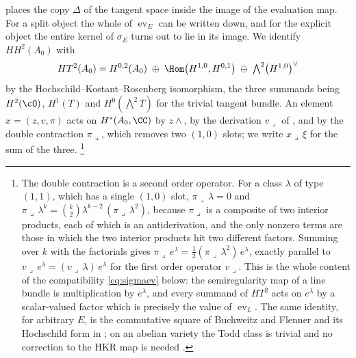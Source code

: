  places the copy $\Delta$ of the tangent space inside the
image of the evaluation map. For a split object the whole of
$\operatorname{ev}_{E}$ can be written down, and for the explicit object the
entire kernel of $\sigma_{E}$ turns out to lie in its image. We identify
$HH^{2}(A_{0})$ with
\begin{equation}\label{eq:HT2}
  HT^{2}(A_{0})
  =H^{0,2}(A_{0})\;\oplus\;\Hom\bigl(H^{1,0},H^{0,1}\bigr)\;\oplus\;
   \textstyle\bigwedge^{2}\bigl(H^{1,0}\bigr)^{\vee}
\end{equation}
by the Hochschild--Kostant--Rosenberg isomorphism, the three summands being
$H^{2}(\cO)$, $H^{1}(T)$ and $H^{0}(\bigwedge^{2}T)$ for the trivial tangent
bundle. An element $x=(z,v,\pi)$ acts on $H^{*}(A_{0},\CC)$ by $z\wedge$, by
the derivation $v\lrcorner$ of , and by the double
contraction $\pi\lrcorner$, which removes two $(1,0)$ slots; we write
$x\lrcorner\,\xi$ for the sum of the three.%
\footnote{The double contraction is a second order operator. For a class
$\lambda$ of type $(1,1)$, which has a single $(1,0)$ slot,
$\pi\lrcorner\,\lambda=0$ and $\pi\lrcorner\,\lambda^{k}=\binom{k}{2}
\lambda^{k-2}\,(\pi\lrcorner\,\lambda^{2})$, because $\pi\lrcorner$ is a
composite of two interior products, each of which is an antiderivation, and
the only nonzero terms are those in which the two interior products hit two
different factors. Summing over $k$ with the factorials gives
$\pi\lrcorner\,e^{\lambda}=\tfrac12(\pi\lrcorner\,\lambda^{2})\,e^{\lambda}$,
exactly parallel to $v\lrcorner\,e^{\lambda}=(v\lrcorner\,\lambda)\,e^{\lambda}$
for the first order operator $v\lrcorner$. This is the whole content of the
compatibility \eqref{eq:sigmaev} below: the semiregularity map of a line
bundle is multiplication by $e^{\lambda}$, and every summand of $HT^{2}$ acts
on $e^{\lambda}$ by a scalar-valued factor which is precisely the value of
$\operatorname{ev}_{L}$. The same identity, for arbitrary $E$, is the
commutative square of Buchweitz and Flenner \cite[Corollary 4.3]{BF03} and
its Hochschild form in \cite[Lemma 11.3]{Mar25b}; on an abelian variety the
Todd class is trivial and no correction to the HKR map is needed
\cite{Cal05,BF08}.}

